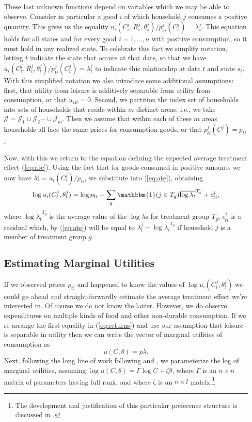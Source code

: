 \documentclass[12pt,letterpaper]{article}
\newcommand{\one}{\ensuremath{\mathbbm{1}}}
\newcommand{\Eq}[1]{(\ref{eq:#1})}
\begin{document}
These last unknown functions depend on variables which we may be able
to observe.  Consider in particular a good \(i\) of which household \(j\)
consumes a positive quantity.  This gives us the equality
\(u_{i}(C^j_s,R^j_s,\theta^j_s)/p^j_{si}(C^j_s)=\lambda^j_s\).  This
equation holds for all states and for every good \(i=1,\dots,n\) with
positive consumption, so it must hold in any realized state.  To
celebrate this fact we simplify notation, letting \(t\) indicate the
state that occurs at that date, so that we have
\(u_{i}(C^j_t,R^j_t,\theta^j_t)/p^j_{ti}(C^j_t)=\lambda^j_t\) to
indicate this relationship at date \(t\) and state \(s_t\).  With this
simplified notation we also introduce some additional assumptions:
first, that utility from leisure is additively separable from utility
from consumption, or that \(u_{iR}=0\).  Second, we partition the index
set of households into sets of households that reside within \(m\)
distinct areas; i.e., we take
\(\mathcal{J}=\mathcal{J}_1\cup\mathcal{J}_2\cdots\cup\mathcal{J}_m\).
Then we assume that within each of these \(m\) areas households all face
the same prices for consumption goods, or that \(p^j_{ti}(C^j)=p_{ti}\).

Now, with this we return to the equation defining the expected average
treatment effect  \Eq{ate}.  Using the fact that for goods consumed in
positive amounts we now have
\(\lambda^j_t=u_i(C^j_t)/p_{ti}\), we substitute into \Eq{ate},
obtaining
\[
   \log u_i(C^j_t,\theta^j_t) = \log p_{ti} + \sum_g\one(j\in T_g)\overline{\log\lambda_t}^{T_g} + \epsilon^j_{ti},
\]
where \(\overline{\log\lambda_t}^{T_g}\) is the average value of the
\(\log\lambda\)s for treatment group \(T_g\),
\(\epsilon^j_{ti}\) is a residual which, by \Eq{ate} will be equal to
\(\lambda^j_t-\overline{\log\lambda_t}^{T_g}\) if household \(j\) is a member
of treatment group \(g\).

\subsection{Estimating Marginal Utilities}
\label{sec:orgheadline11}

If we observed prices \(p_{ti}\) and happened to know the values of
\(\log u_i(C^j_t,\theta^j_t)\) we could go ahead and straight-forwardly
estimate the average treatment effect we're interested in.  Of course
we do not know the latter.  However, we do observe expenditures on
multiple kinds of food and other non-durable consumption.  If we
re-arrange the first equality in \Eq{returns} and use our assumption
that leisure is separable in utility then we can write the vector of
marginal utilities of consumption as \[ u(C,\theta)=p\lambda.  \]
Next, following the long line of work following
\cite{Heckman-Macurdy80} and \cite{Macurdy83}, we parameterize the log
of marginal utilities, assuming \(\log u(C,\theta)=\Gamma\log C +
\zeta\theta\), where \(\Gamma\) is an \(n\times n\) matrix of parameters
having full rank, and where \(\zeta\) is an \(n\times l\) matrix.\footnote{The
development and justification of this particular preference structure
is discussed in \cite{ligon15}.}
\end{document}
